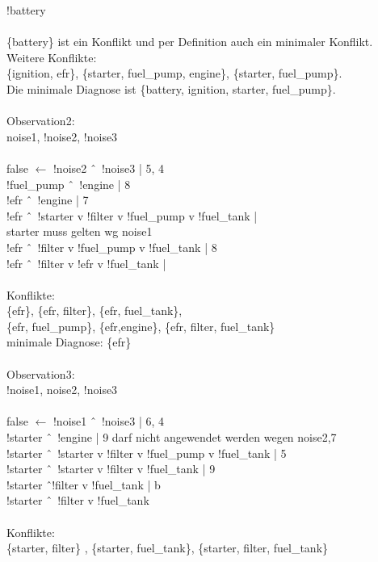 \documentclass[DIV=9,numbers=noenddot]{scrartcl}
\begin{document}
	!battery\\\\
	\{battery\} ist ein Konflikt und per Definition auch ein minimaler Konflikt.\\
	Weitere Konflikte:\\ \{ignition, efr\}, \{starter, fuel\_pump, engine\}, \{starter, fuel\_pump\}.\\
	Die minimale Diagnose ist \{battery, ignition, starter, fuel\_pump\}.\\\\
	Observation2:\\
	noise1, !noise2, !noise3\\\\
	false $\leftarrow$ !noise2 \^\ \ !noise3	| 5, 4\\
	!fuel\_pump \^\ \ !engine		| 8\\
	!efr \^\ \ !engine			| 7\\
	!efr \^\ \ !starter v !filter v !fuel\_pump v !fuel\_tank |\\ starter muss gelten wg noise1\\
	!efr \^\ \  !filter v !fuel\_pump v !fuel\_tank	| 8\\
	!efr \^\ \ !filter v !efr v !fuel\_tank		|\\\\
	Konflikte:\\  \{efr\}, \{efr, filter\}, \{efr, fuel\_tank\},\\ \{efr, fuel\_pump\}, \{efr,engine\}, \{efr, filter, fuel\_tank\}\\
	minimale Diagnose: \{efr\}\\\\
	Observation3:\\
	!noise1, noise2, !noise3\\\\
	false $\leftarrow$ !noise1 \^\ \ !noise3	| 6, 4\\
	!starter \^\ \ !engine		| 9 darf nicht angewendet werden wegen noise2,7\\
	!starter \^\ \ !starter v !filter v !fuel\_pump v !fuel\_tank	| 5\\
	!starter \^\ \ !starter v !filter v !fuel\_tank	| 9\\
	!starter \^\ !filter v !fuel\_tank 	| b\\
	!starter \^\ \ !filter v !fuel\_tank\\\\
	Konflikte:\\ \{starter, filter\} , \{starter, fuel\_tank\}, \{starter,  filter, fuel\_tank\}\\\\
\end{document}
